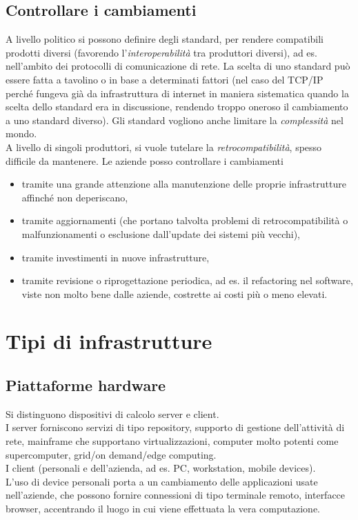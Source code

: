 \subsection{Controllare i cambiamenti}
A livello politico si possono definire degli standard, per rendere compatibili prodotti diversi (favorendo l'\textit{interoperabilit\`a} tra produttori diversi), ad es. nell'ambito dei protocolli di comunicazione di rete. La scelta di uno standard pu\`o essere fatta a tavolino o in base a determinati fattori (nel caso del TCP/IP perch\'e fungeva gi\`a da infrastruttura di internet in maniera sistematica quando la scelta dello standard era in discussione, rendendo troppo oneroso il cambiamento a uno standard diverso).
Gli standard vogliono anche limitare la \textit{complessit\`a} nel mondo. \\
A livello di singoli produttori, si vuole tutelare la \textit{retrocompatibilit\`a}, spesso difficile da mantenere.
Le aziende posso controllare i cambiamenti
\begin{itemize}
\item tramite una grande attenzione alla manutenzione delle proprie infrastrutture affinch\'e non deperiscano,
\item tramite aggiornamenti (che portano talvolta problemi di retrocompatibilit\`a o malfunzionamenti o esclusione dall'update dei sistemi pi\`u vecchi),
\item tramite investimenti in nuove infrastrutture,
\item tramite revisione o riprogettazione periodica, ad es. il refactoring nel software, viste non molto bene dalle aziende, costrette ai costi pi\`u o meno elevati.
\end{itemize}

\section{Tipi di infrastrutture}
\subsection{Piattaforme hardware}
Si distinguono dispositivi di calcolo server e client.\\
I server forniscono servizi di tipo repository, supporto di gestione dell'attivit\`a di rete, mainframe che supportano virtualizzazioni, computer molto potenti come supercomputer, grid/on demand/edge computing.\\
I client (personali e dell'azienda, ad es. PC, workstation, mobile devices).\\
L'uso di device personali porta a un cambiamento delle applicazioni usate nell'aziende, che possono fornire connessioni di tipo terminale remoto, interfacce browser, accentrando il luogo in cui viene effettuata la vera computazione.
